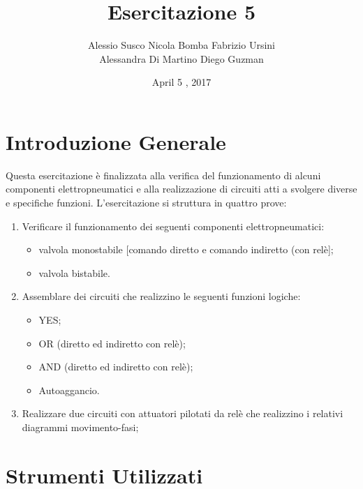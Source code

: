 \documentclass[a4paper]{article}
\begin{document}
\title{Esercitazione 5}
\date{April 5 , 2017}
\maketitle


\author{Alessio Susco \hspace*{2cm} Nicola Bomba \hspace*{2cm} Fabrizio Ursini  \\  \hspace*{1,85cm} Alessandra Di Martino \hspace*{1,25cm} Diego Guzman}

 

\tableofcontents

\clearpage


\section{Introduzione Generale}
Questa esercitazione è finalizzata alla verifica del funzionamento di alcuni componenti elettropneumatici e alla realizzazione di circuiti atti a svolgere diverse e specifiche funzioni.
L’esercitazione si struttura in quattro prove:
\begin{enumerate}
\item Verificare il funzionamento dei seguenti componenti elettropneumatici:
\begin{itemize}
\item valvola monostabile [comando diretto e comando indiretto (con relè];
\item valvola bistabile.
\end{itemize} 
\item Assemblare dei circuiti che realizzino le seguenti funzioni logiche:
\begin{itemize}
\item YES;
\item OR (diretto ed indiretto con relè);
\item AND (diretto ed indiretto con relè);
\item Autoaggancio.
\end{itemize} 
\item Realizzare due circuiti con attuatori pilotati da relè che realizzino i relativi diagrammi movimento-fasi;
\end{enumerate}


\section{Strumenti Utilizzati}
\end{document}

